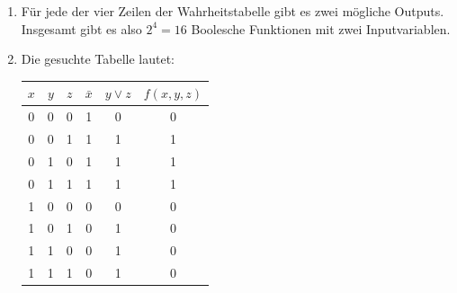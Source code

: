 {\begin{myanswer}
\begin{enumerate}
    \item Für jede der vier Zeilen der Wahrheitstabelle gibt es zwei mögliche Outputs. Insgesamt gibt es also $2^4=16$ Boolesche Funktionen mit zwei Inputvariablen.
    \item Die gesuchte Tabelle lautet:\\
        \begin{tabular}{c|c|c||c | c || c}
            $x$ & $y$ & $z$ & $\bar x$ & $y\vee z$ & $f(x,y,z)$ \\
            \hline
            0 & 0 & 0 & 1 & 0 & 0 \\
            0 & 0 & 1 & 1 & 1 & 1 \\
            0 & 1 & 0 & 1 & 1 & 1 \\
            0 & 1 & 1 & 1 & 1 & 1 \\
            1 & 0 & 0 & 0 & 0 & 0 \\
            1 & 0 & 1 & 0 & 1 & 0 \\
            1 & 1 & 0 & 0 & 1 & 0 \\
            1 & 1 & 1 & 0 & 1 & 0 
        \end{tabular}  
   \end{enumerate}
\end{myanswer}
}
